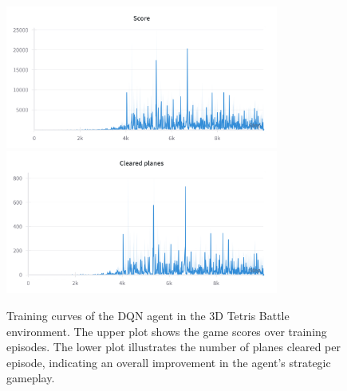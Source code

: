 \begin{figure}[htbp]
    \centering
    \includegraphics[width=0.8\textwidth]{./images/score_history.png}\\[0.5cm]
    \includegraphics[width=0.8\textwidth]{./images/cleared_planes.png}
    \caption{Training curves of the DQN agent in the 3D Tetris Battle environment. The upper plot shows the game scores over training episodes. The lower plot illustrates the number of planes cleared per episode, indicating an overall improvement in the agent's strategic gameplay.}
    \label{fig:training_curve}
\end{figure}